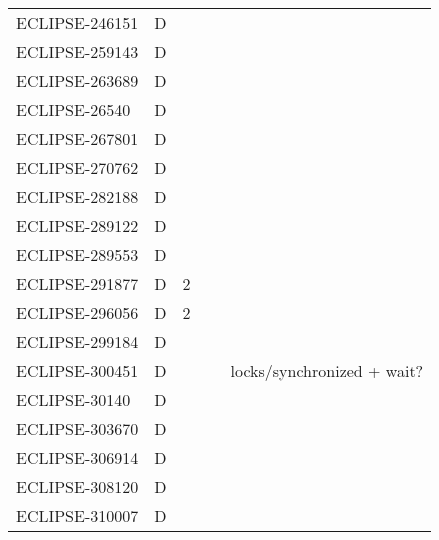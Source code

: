 \begin{table}[!htp]
{\begin{tabular}{lllll}
    ECLIPSE-246151 & D        & ~             & ~               & ~                                           \\
    ECLIPSE-259143 & D        & ~             & ~               & ~                                           \\
    ECLIPSE-263689 & D        & ~             & ~               & ~                                           \\
    ECLIPSE-26540  & D        & ~             & ~               & ~                                           \\
    ECLIPSE-267801 & D        & ~             & ~               & ~                                           \\
    ECLIPSE-270762 & D        & ~             & ~               & ~                                           \\
    ECLIPSE-282188 & D        & ~             & ~               & ~                                           \\
    ECLIPSE-289122 & D        & ~             & ~               & ~                                           \\
    ECLIPSE-289553 & D        & ~             & ~               & ~                                           \\
    ECLIPSE-291877 & D        & 2             & ~               & ~                                           \\
    ECLIPSE-296056 & D        & 2             & ~               & ~                                           \\
    ECLIPSE-299184 & D        & ~             & ~               & ~                                           \\
    ECLIPSE-300451 & D        & ~             & ~               & locks/synchronized + wait?                  \\
    ECLIPSE-30140  & D        & ~             & ~               & ~                                           \\
    ECLIPSE-303670 & D        & ~             & ~               & ~                                           \\
    ECLIPSE-306914 & D        & ~             & ~               & ~                                           \\
    ECLIPSE-308120 & D        & ~             & ~               & ~                                           \\
    ECLIPSE-310007 & D        & ~             & ~               & ~                                           \\
	\bottomrule
	\end{tabular}
	}
\end{table}

